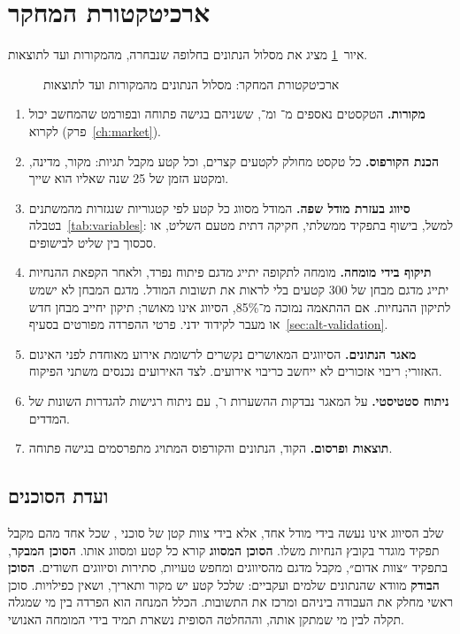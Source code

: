 \section{ארכיטקטורת המחקר}
\label{sec:alt-architecture}

איור~\ref{fig:alt-architecture} מציג את מסלול הנתונים בחלופה שנבחרה, מהמקורות ועד לתוצאות.

\begin{figure}[htbp]
  \centering
  
  \caption{ארכיטקטורת המחקר: מסלול הנתונים מהמקורות ועד לתוצאות}
  \label{fig:alt-architecture}
\end{figure}

\begin{enumerate}
  \item \textbf{מקורות.} הטקסטים נאספים מ־ ומ־, ששניהם בגישה פתוחה ובפורמט שהמחשב יכול לקרוא (פרק~\ref{ch:market}).
  \item \textbf{הכנת הקורפוס.} כל טקסט מחולק לקטעים קצרים, וכל קטע מקבל תגיות: מקור, מדינה, ומקטע הזמן של 25 שנה שאליו הוא שייך.
  \item \textbf{סיווג בעזרת מודל שפה.} המודל מסווג כל קטע לפי קטגוריות שנגזרות מהמשתנים בטבלה~\ref{tab:variables}: למשל, בישוף בתפקיד ממשלתי, חקיקה דתית מטעם השליט, או סכסוך בין שליט לבישופים.
  \item \textbf{תיקוף בידי מומחה.} מומחה לתקופה יתייג מדגם פיתוח נפרד, ולאחר הקפאת ההנחיות יתייג מדגם מבחן של 300 קטעים בלי לראות את תשובות המודל. מדגם המבחן לא ישמש לתיקון ההנחיות. אם ההתאמה נמוכה מ־85\%, הסיווג אינו מאושר; תיקון יחייב מבחן חדש או מעבר לקידוד ידני. פרטי ההפרדה מפורטים בסעיף~\ref{sec:alt-validation}.
  \item \textbf{מאגר הנתונים.} הסיווגים המאושרים נקשרים לרשומת אירוע מאוחדת לפני האיגום האזורי; ריבוי אזכורים לא ייחשב כריבוי אירועים. לצד האירועים נכנסים משתני הפיקוח.
  \item \textbf{ניתוח סטטיסטי.} על המאגר נבדקות ההשערות  ו־, עם ניתוח רגישות להגדרות השונות של המדדים.
  \item \textbf{תוצאות ופרסום.} הקוד, הנתונים והקורפוס המתויג מתפרסמים בגישה פתוחה.
\end{enumerate}

\subsection*{ועדת הסוכנים}

שלב הסיווג אינו נעשה בידי מודל אחד, אלא בידי צוות קטן של סוכני , שכל אחד מהם מקבל תפקיד מוגדר בקובץ הנחיות משלו. \textbf{הסוכן המסווג} קורא כל קטע ומסווג אותו. \textbf{הסוכן המבקר}, בתפקיד ״צוות אדום״, מקבל מדגם מהסיווגים ומחפש טעויות, סתירות וסיווגים חשודים. \textbf{הסוכן הבודק} מוודא שהנתונים שלמים ועקביים: שלכל קטע יש מקור ותאריך, ושאין כפילויות. סוכן ראשי מחלק את העבודה ביניהם ומרכז את התשובות. הכלל המנחה הוא הפרדה בין מי שמגלה תקלה לבין מי שמתקן אותה, וההחלטה הסופית נשארת תמיד בידי המומחה האנושי.

